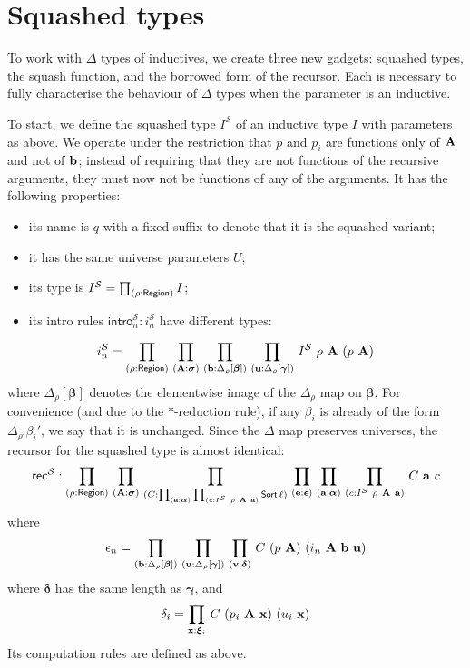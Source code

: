 \section{Squashed types}
To work with \( \Delta \) types of inductives, we create three new gadgets: squashed types, the squash function, and the borrowed form of the recursor.
Each is necessary to fully characterise the behaviour of \( \Delta \) types when the parameter is an inductive.

To start, we define the squashed type \( I^{\mathcal S} \) of an inductive type \( I \) with parameters as above.
We operate under the restriction that \( p \) and \( p_i \) are functions only of \( \vb A \) and not of \( \vb b \); instead of requiring that they are not functions of the recursive arguments, they must now not be functions of any of the arguments.
It has the following properties:
\begin{itemize}
	\item its name is \( q \) with a fixed suffix to denote that it is the squashed variant;
	\item it has the same universe parameters \( U \);
	\item its type is \( I^{\mathcal S} = \prd{\rho : \Region} I \);
	\item its intro rules \( \mathsf{intro}_n^{\mathcal S} : i_n^{\mathcal S} \) have different types:
\end{itemize}
\[ i_n^{\mathcal S} = \prd{\rho : \Region}{\vb A : \bm \sigma}{\vb b : \Delta_\rho[\bm \beta]}{\vb u : \Delta_\rho[\bm \gamma]} I^{\mathcal S}\ \rho\ \vb A\ (p\ \vb A) \]
where \( \Delta_\rho[\bm \beta] \) denotes the elementwise image of the \( \Delta_\rho \) map on \( \bm \beta \).
For convenience (and due to the \( \ast \)-reduction rule), if any \( \beta_i \) is already of the form \( \Delta_{\rho'} \beta_i' \), we say that it is unchanged.
Since the \( \Delta \) map preserves universes, the recursor for the squashed type is almost identical:
\[ \mathsf{rec}^{\mathcal S} : \prd{\rho : \Region}{\vb A : \bm \sigma}{C : \prd{\vb a : \bm \alpha}{c : I^{\mathcal S}\ \rho\ \vb A\ \vb a} \Sort \ell}{\vb e : \bm \epsilon}{\vb a : \bm \alpha}{c : I^{\mathcal S}\ \rho\ \vb A\ \vb a} C\ \vb a\ c \]
where
\[ \epsilon_n = \prd{\vb b : \Delta_\rho[\bm \beta]}{\vb u : \Delta_\rho[\bm \gamma]}{\vb v : \bm \delta} C\ (p\ \vb A)\ (i_n\ \vb A\ \vb b\ \vb u) \]
where \( \bm \delta \) has the same length as \( \bm \gamma \), and
\[ \delta_i = \prd{\vb x:\bm \xi_i} C\ (p_i\ \vb A\ \vb x)\ (u_i\ \vb x) \]
Its computation rules are defined as above.
